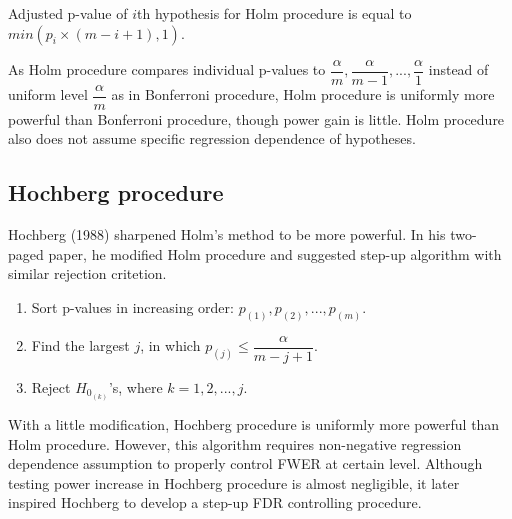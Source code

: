\documentclass[a4paper, 11pt, oneside]{article}
\begin{document}
Adjusted p-value of $i$th hypothesis for Holm procedure is equal to $min(p_i \times (m-i+1), 1)$. \par
    As Holm procedure compares individual p-values to $\dfrac{\alpha}{m}, \dfrac{\alpha}{m-1}, ..., \dfrac{\alpha}{1}$ instead of uniform level $\dfrac{\alpha}{m}$ as in Bonferroni procedure, Holm procedure is uniformly more powerful than Bonferroni procedure, though power gain is little. Holm procedure also does not assume specific regression dependence of hypotheses.


\subsection{Hochberg procedure}
Hochberg (1988) sharpened Holm's method to be more powerful. In his two-paged paper, he modified Holm procedure and suggested step-up algorithm with similar rejection critetion. 
\begin{enumerate}
  \item Sort p-values in increasing order: $p_{(1)}, p_{(2)}, ..., p_{(m)}$.
  \item Find the largest $j$, in which $p_{(j)} \leq \dfrac{\alpha}{m-j+1}$.
  \item Reject $H_{0_{(k)}}$'s, where $k=1, 2, ..., j$.
\end{enumerate}
    With a little modification, Hochberg procedure is uniformly more powerful than Holm procedure. However, this algorithm requires non-negative regression dependence assumption to properly control FWER at certain level. Although testing power increase in Hochberg procedure is almost negligible, it later inspired Hochberg to develop a step-up FDR controlling procedure.

\vspace{0.2in}
\end{document}
